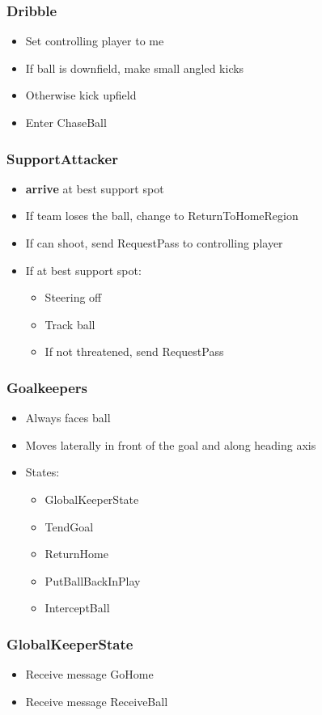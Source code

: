 \documentclass[handout,t,compress]{beamer}
\newcommand{\bframe}[1]{\begin{frame}[fragile]\frametitle{#1}}
\begin{document}
\bframe{Dribble}
\begin{itemize}
\item Set controlling player to me
\item If ball is downfield, make small angled kicks
\item Otherwise kick upfield
\item Enter ChaseBall
\end{itemize}
\end{frame}

\bframe{SupportAttacker}
\begin{itemize}
\item {\bf arrive} at best support spot
\item If team loses the ball, change to ReturnToHomeRegion
\item If can shoot, send RequestPass to controlling player
\item If at best support spot:
\begin{itemize}
\item Steering off
\item Track ball
\item If not threatened, send RequestPass
\end{itemize}
\end{itemize}
\end{frame}

\bframe{Goalkeepers}
\begin{itemize}
\item Always faces ball
\item Moves laterally in front of the goal and along heading axis
\item States:
\begin{itemize}
\item GlobalKeeperState
\item TendGoal
\item ReturnHome
\item PutBallBackInPlay
\item InterceptBall
\end{itemize}
\end{itemize}
\end{frame}

\bframe{GlobalKeeperState}
\begin{itemize}
\item Receive message GoHome
\item Receive message ReceiveBall
\end{itemize}
\end{frame}
\end{document}
